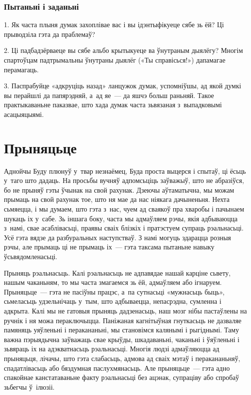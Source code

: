 \subsubsection{Пытаньні і заданьні}

1. Як часта плыня думак захоплівае вас і вы ідэнтыфікуеце сябе зь ёй? Ці прыводзіла гэта да праблемаў?

2. Ці падбадзёрваеце вы сябе альбо крытыкуеце ва ўнутраным дыялёгу? Многім спартоўцам падтрымальны ўнутраны дыялёг («Ты справісься!») дапамагае перамагаць.

3. Паспрабуйце «адкруціць назад» ланцужок думак, успомніўшы, ад якой думкі вы перайшлі да папярэдняй, а~ад яе~--- да яшчэ больш раньняй. Такое практыкаваньне паказвае, што хада думак часта зьвязаная з~выпадковымі асацыяцыямі.


\section{Прыняцьце}

Аднойчы Буду плюнуў у~твар незнаёмец, Буда проста выцерся і спытаў, ці ёсьць у~таго што дадаць. На просьбы вучняў адпомсьціць заўважыў, што не абразіўся, бо не прыняў гэты ўчынак на свой рахунак. Дзеючы аўтаматычна, мы можам прымаць на свой рахунак тое, што ня мае да нас ніякага дачыненьня. Нехта сьмяецца, і мы думаем, што гэта з~нас, чуем ад сваякоў пра хваробы і пачынаем шукаць іх у~сабе. Зь іншага боку, часта мы адмаўляем рэчы, якія адбываюцца з~намі, свае асаблівасьці, праявы сваіх блізкіх і пратэстуем супраць рэальнасьці. Усё гэта вядзе да разбуральных наступстваў. З намі могуць здарацца розныя рэчы, але прымаць ці не прымаць іх~--- гэта таксама пытаньне навыку ўсьвядомленасьці.

Прыняць рэальнасьць. Калі рэальнасьць не адпавядае нашай карціне сьвету, нашым чаканьням, то мы часта змагаемся зь ёй, адмаўляем або ігнаруем. Прыняцьце~--- гэта не пасіўны працэс, а~па сутнасьці «мужнасьць быць», сьмеласьць удзельнічаць у~тым, што адбываецца, непасрэдна, сумленна і адкрыта. Калі мы не гатовыя прыняць дадзенасьць, наш мозг нібы пастаўлены на ручнік і ня можа пераключыцца. Паніжаная кагнітыўная гнуткасьць не дазваляе памяняць уяўленьні і перакананьні, мы становімся калянымі і рыгіднымі. Таму важна пэрыядычна заўважаць свае крыўды, шкадаваньні, чаканьні і ўяўленьні і зьвяраць іх на адэкватнасьць рэальнасьці. Многія людзі адмаўляюцца ад прыняцьця, лічачы, што гэта слабасьць, адмова ад сваіх мэтаў і перакананьняў, спадатлівасьць або бяздумная паслухмянасьць. Але прыняцьце~--- гэта адно спакойнае канстатаваньне факту рэальнасьці без ацэнак, супраціву або спробаў зьбегчы ў~ілюзіі.


